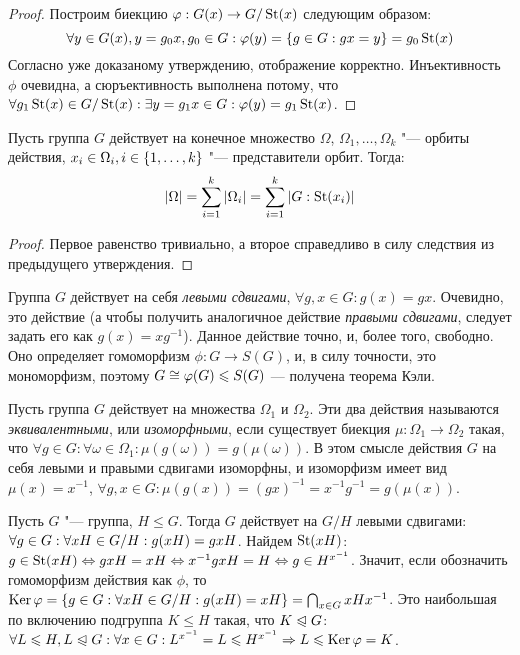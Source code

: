 \begin{proof}
	Построим биекцию $\varphi: G(x) \to G / \operatorname{St}(x)$ следующим образом: 
	\[
		\forall y \hm\in G(x), y = g_0x, g_0 \in G: \phi(y) = \{g \in G: gx = y\} \hm= g_0\St(x)
	\]
	Согласно уже доказаному утверждению, отображение корректно. Инъективность $\phi$ очевидна, а сюръективность выполнена потому, что $\forall g_1\St(x) \in G / \St(x): \exists y = g_1x \in G: \phi(y) \hm= g_1\St(x)$.
\end{proof}

\begin{theorem}
	Пусть группа $G$ действует на конечное множество $\Omega$, $\Omega_1, \dotsc, \Omega_k$ "--- орбиты действия, $x_i \in \Omega_i, i \hm\in \{1, \dotsc, k\}$ "--- представители орбит. Тогда:
	\[|\Omega| = \sum\limits_{i = 1}^k|\Omega_i| = \sum\limits_{i = 1}^k|G : \operatorname{St}(x_i)|\]
\end{theorem}

\begin{proof}
	Первое равенство тривиально, а второе справедливо в силу следствия из предыдущего утверждения.
\end{proof}

\begin{example}
	Группа $G$ действует на себя \textit{левыми сдвигами}, $\forall g, x \in G: g(x) = gx$. Очевидно, это действие (а чтобы получить аналогичное действие \textit{правыми сдвигами}, следует задать его как $g(x) = xg^{-1}$). Данное действие точно, и, более того, свободно. Оно определяет гомоморфизм $\phi: G \to S(G)$, и, в силу точности, это мономорфизм, поэтому $G \cong \phi(G) \hm\le S(G)$ --- получена теорема Кэли.
\end{example}

\begin{note}
	Пусть группа $G$ действует на множества $\Omega_1$ и $\Omega_2$. Эти два действия называются \textit{эквивалентными}, или \textit{изоморфными}, если существует биекция $\mu: \Omega_1 \to \Omega_2$ такая, что $\forall g \in G: \forall \omega \in \Omega_1: \mu(g(\omega)) = g(\mu(\omega))$. В этом смысле действия $G$ на себя левыми и правыми сдвигами изоморфны, и изоморфизм имеет вид $\mu(x) = x^{-1}$, $\forall g, x \in G: \mu(g(x)) = (gx)^{-1} = x^{-1}g^{-1} = g(\mu(x))$.
\end{note}

\begin{example}
	Пусть $G$ "--- группа, $H \le G$. Тогда $G$ действует на $G / H$ левыми сдвигами: $\forall g \hm\in G: \forall xH \in G / H: g(xH) = gxH$. Найдем $\operatorname{St}(xH)$: $g \in \St(xH) \Leftrightarrow gxH = xH \Leftrightarrow x^{-1}gxH \hm= H \Leftrightarrow g \hm\in H^{x^{-1}}$. Значит, если обозначить гомоморфизм действия как $\phi$, то $\ke\phi \hm= \{g \hm\in G: \forall xH \in G / H: g(xH) = xH\} = \bigcap_{x \in G} xHx^{-1}$. Это наибольшая по включению подгруппа $K \le H$ такая, что $K \trianglelefteqslant G$: $\forall L \le H, L \normal G: \forall x \in G: L^{x^{-1}} = L \le H^{x^{-1}} \ra L \hm\le \ke\phi = K$.
\end{example}

